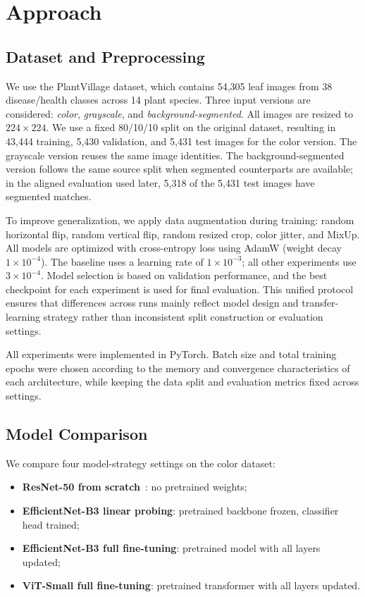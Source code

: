 \documentclass[10pt,twocolumn,letterpaper]{article}
\begin{document}
\section{Approach}

\subsection{Dataset and Preprocessing}

We use the PlantVillage dataset, which contains 54,305 leaf images from 38 disease/health classes across 14 plant species. Three input versions are considered: \textit{color}, \textit{grayscale}, and \textit{background-segmented}. All images are resized to $224 \times 224$. We use a fixed 80/10/10 split on the original dataset, resulting in 43,444 training, 5,430 validation, and 5,431 test images for the color version. The grayscale version reuses the same image identities. The background-segmented version follows the same source split when segmented counterparts are available; in the aligned evaluation used later, 5,318 of the 5,431 test images have segmented matches.

To improve generalization, we apply data augmentation during training: random horizontal flip, random vertical flip, random resized crop, color jitter, and MixUp. All models are optimized with cross-entropy loss using AdamW (weight decay $1{\times}10^{-4}$). The baseline uses a learning rate of $1{\times}10^{-3}$; all other experiments use $3{\times}10^{-4}$. Model selection is based on validation performance, and the best checkpoint for each experiment is used for final evaluation. This unified protocol ensures that differences across runs mainly reflect model design and transfer-learning strategy rather than inconsistent split construction or evaluation settings.

All experiments were implemented in PyTorch. Batch size and total training epochs were chosen according to the memory and convergence characteristics of each architecture, while keeping the data split and evaluation metrics fixed across settings.

\subsection{Model Comparison}

We compare four model-strategy settings on the color dataset:
\begin{itemize}
    \item \textbf{ResNet-50 from scratch}~\cite{he2016resnet}: no pretrained weights;
    \item \textbf{EfficientNet-B3 linear probing}: pretrained backbone frozen, classifier head trained;
    \item \textbf{EfficientNet-B3 full fine-tuning}: pretrained model with all layers updated;
    \item \textbf{ViT-Small full fine-tuning}: pretrained transformer with all layers updated.
\end{itemize}
\end{document}
